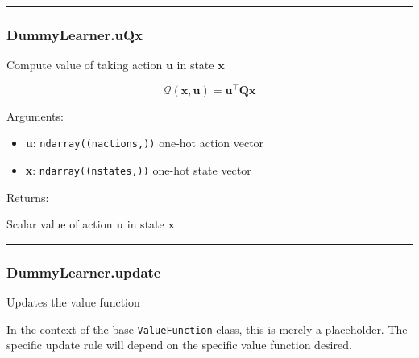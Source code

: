 \begin{center}\rule{0.5\linewidth}{\linethickness}\end{center}

\subsubsection{DummyLearner.uQx}\label{dummylearner.uqx}

\begin{Shaded}
\begin{Highlighting}[]
\end{Highlighting}
\end{Shaded}

Compute value of taking action \(\mathbf u\) in state \(\mathbf x\)

\[
\mathcal Q(\mathbf x, \mathbf u) = \mathbf u^\top \mathbf Q \mathbf x
\]

Arguments:

\begin{itemize}
\tightlist
\item
  \textbf{u}: \texttt{ndarray((nactions,))} one-hot action vector
\item
  \textbf{x}: \texttt{ndarray((nstates,))} one-hot state vector
\end{itemize}

Returns:

Scalar value of action \(\mathbf u\) in state \(\mathbf x\)

\begin{center}\rule{0.5\linewidth}{\linethickness}\end{center}

\subsubsection{DummyLearner.update}\label{dummylearner.update}

\begin{Shaded}
\begin{Highlighting}[]
\end{Highlighting}
\end{Shaded}

Updates the value function

In the context of the base \texttt{ValueFunction} class, this is merely
a placeholder. The specific update rule will depend on the specific
value function desired.

